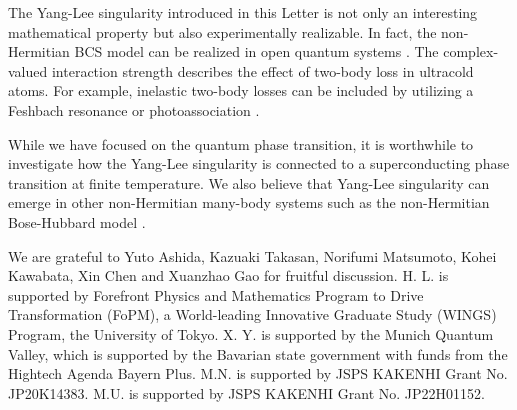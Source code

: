 \documentclass[aps,prl,twocolumn,nofootinbib,superscriptaddress,notitlepage,longbibliography]{revtex4-1}
\begin{document}
	The Yang-Lee singularity introduced in this Letter is not only an interesting mathematical property but also experimentally realizable. In fact, the non-Hermitian BCS model can be realized in open quantum systems \cite{Yamamoto2019,PhysRevA.103.013724}. The complex-valued interaction strength describes the effect of two-body loss in ultracold atoms. For example, inelastic two-body losses can be included by utilizing a Feshbach resonance \cite{PhysRevLett.115.265301,PhysRevLett.115.265302,Zhang2015} or photoassociation \cite{doi:10.1126/sciadv.1701513,https://doi.org/10.48550/arxiv.2205.13162}. %
	
	While we have focused on the quantum phase transition, it is worthwhile to investigate how the Yang-Lee singularity is connected to a superconducting phase transition at finite temperature. We also believe that Yang-Lee singularity can emerge in other non-Hermitian many-body systems such as the non-Hermitian Bose-Hubbard model \cite{PhysRevA.94.053615}.
	
	We are grateful to Yuto Ashida, Kazuaki Takasan, Norifumi Matsumoto,
	Kohei Kawabata, Xin Chen and Xuanzhao Gao for fruitful discussion.
	H. L. is supported by Forefront Physics and Mathematics Program to
	Drive Transformation (FoPM), a World-leading Innovative Graduate Study
	(WINGS) Program, the University of Tokyo. X. Y. is supported by the Munich Quantum Valley, which is supported by the Bavarian state government with funds from the Hightech Agenda Bayern Plus. M.N. is supported by JSPS
	KAKENHI Grant No. JP20K14383. M.U. is supported by JSPS KAKENHI Grant
	No. JP22H01152. 
	
\end{document}
